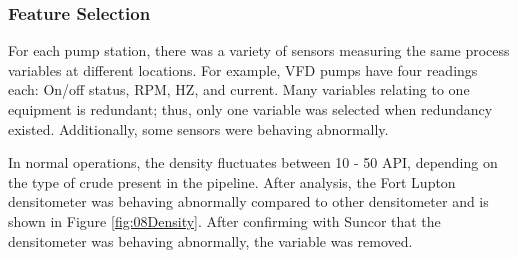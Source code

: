 \subsubsection{Feature Selection}
For each pump station, there was a variety of sensors measuring the same process variables at different locations.  For example, VFD pumps have four readings each: On/off status, RPM, HZ, and current. Many variables relating to one equipment is redundant; thus, only one variable was selected when redundancy existed. Additionally, some sensors were behaving abnormally.

In normal operations, the density fluctuates between 10 - 50 API, depending on the type of crude present in the pipeline.  After analysis, the Fort Lupton densitometer was behaving abnormally compared to other densitometer and is shown in Figure \ref{fig:08Density}.  After confirming with Suncor that the densitometer was behaving abnormally, the variable was removed.  

